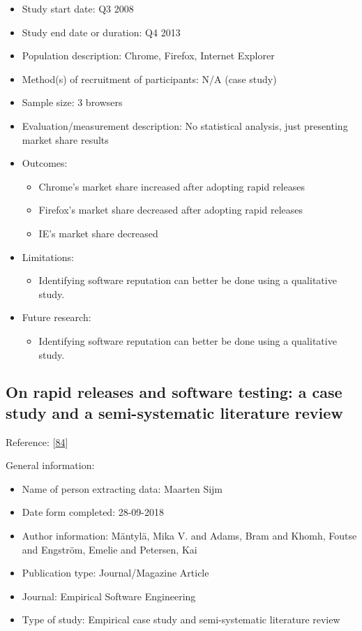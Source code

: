 \documentclass[]{book}
\providecommand{\tightlist}{%
  \setlength{\itemsep}{0pt}\setlength{\parskip}{0pt}}
\begin{document}
\begin{itemize}
\tightlist
\item
  Study start date: Q3 2008
\item
  Study end date or duration: Q4 2013
\item
  Population description: Chrome, Firefox, Internet Explorer
\item
  Method(s) of recruitment of participants: N/A (case study)
\item
  Sample size: 3 browsers
\item
  Evaluation/measurement description: No statistical analysis, just
  presenting market share results
\item
  Outcomes:

  \begin{itemize}
  \tightlist
  \item
    Chrome's market share increased after adopting rapid releases
  \item
    Firefox's market share decreased after adopting rapid releases
  \item
    IE's market share decreased
  \end{itemize}
\item
  Limitations:

  \begin{itemize}
  \tightlist
  \item
    Identifying software reputation can better be done using a
    qualitative study.
  \end{itemize}
\item
  Future research:

  \begin{itemize}
  \tightlist
  \item
    Identifying software reputation can better be done using a
    qualitative study.
  \end{itemize}
\end{itemize}

\subsection{On rapid releases and software testing: a case study and a
semi-systematic literature
review}\label{on-rapid-releases-and-software-testing-a-case-study-and-a-semi-systematic-literature-review}

Reference: {[}\protect\hyperlink{ref-mantyla2015a}{84}{]}

General information:

\begin{itemize}
\tightlist
\item
  Name of person extracting data: Maarten Sijm
\item
  Date form completed: 28-09-2018
\item
  Author information: Mäntylä, Mika V. and Adams, Bram and Khomh, Foutse
  and Engström, Emelie and Petersen, Kai
\item
  Publication type: Journal/Magazine Article
\item
  Journal: Empirical Software Engineering
\item
  Type of study: Empirical case study and semi-systematic literature
  review
\end{itemize}
\end{document}
